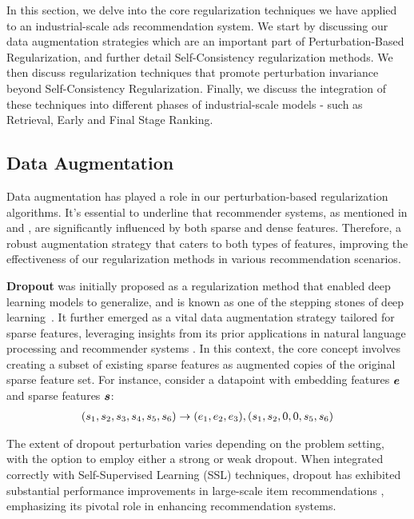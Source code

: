 In this section, we delve into the core regularization techniques we have applied to an industrial-scale ads recommendation system. 
We start by discussing our data augmentation strategies which are an important part of Perturbation-Based Regularization, and further detail Self-Consistency regularization methods. 
We then discuss regularization techniques that promote perturbation invariance beyond Self-Consistency Regularization.
Finally, we discuss the integration of these techniques into different phases of industrial-scale models - such as Retrieval, Early and Final Stage Ranking.


\subsection{Data Augmentation} 

Data augmentation has played a role in our perturbation-based regularization algorithms. 
It's essential to underline that recommender systems, as mentioned in \cite{int_ctr} and \cite{augmentation2}, are significantly influenced by both sparse and dense features. 
Therefore, a robust augmentation strategy that caters to both types of features, improving the effectiveness of our regularization methods in various recommendation scenarios.

\textbf{Dropout}  
was initially proposed as a regularization method that enabled deep learning models to generalize, and is known as one of the stepping stones of deep learning~\cite{srivastava2014dropout}.
It further emerged as a vital data augmentation strategy tailored for sparse features, leveraging insights from its prior applications in natural language processing \cite{gao2021simcse} and recommender systems \cite{augmentation2}. In this context, the core concept involves creating a subset of existing sparse features as augmented copies of the original sparse feature set.
For instance, consider a datapoint with embedding features ${\bm{e}}$ and sparse features ${\bm{s}}$:
\begin{align*}
    ({s}_1,{s}_2,{s}_3,{s}_4,{s}_5,{s}_6) \rightarrow  ({e}_1, {e}_2, e_3), 
    ({s}_1,{s}_2,0,0,{s}_5, {s}_6) 
\end{align*}

The extent of dropout perturbation varies depending on the problem setting, with the option to employ either a strong or weak dropout. When integrated correctly with Self-Supervised Learning (SSL) techniques, dropout has exhibited substantial performance improvements in large-scale item recommendations \cite{augmentation2}, emphasizing its pivotal role in enhancing recommendation systems.

